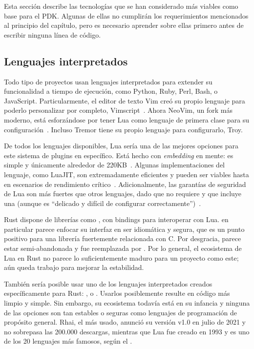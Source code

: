 Esta sección describe las tecnologías que se han considerado más viables como
base para el PDK. Algunas de ellas no cumplirán los requerimientos mencionados
al principio del capítulo, pero es necesario aprender sobre ellas primero antes
de escribir ninguna línea de código.

\subsection{Lenguajes interpretados}

Todo tipo de proyectos usan lenguajes interpretados para extender su
funcionalidad a tiempo de ejecución, como Python, Ruby, Perl, Bash, o
JavaScript. Particularmente, el editor de texto Vim creó su propio lenguaje para
poderlo personalizar por completo, Vimscript~\cite{vimscript}. Ahora NeoVim, un
fork más moderno, está esforzándose por tener Lua como lenguaje de primera clase
para su configuración~\cite{nvimlua}. Incluso Tremor tiene su propio lenguaje
para configurarlo, Troy.

De todos los lenguajes disponibles, Lua sería una de las mejores opciones para
este sistema de plugins en específico. Está hecho con \emph{embedding} en mente:
es simple y únicamente alrededor de 220KB~\cite{ierusalimschy2006programming}.
Algunas implementaciones del lenguaje, como LuaJIT, son extremadamente
eficientes y pueden ser viables hasta en escenarios de rendimiento
crítico~\cite{luajitperf}. Adicionalmente, las garantías de seguridad de Lua son
más fuertes que otros lenguajes, dado que no requiere \unsafe y que incluye una
\sandbox (aunque es ``delicado y difícil de configurar
correctamente'')~\cite{luasandboxes}.

Rust dispone de librerías como , con bindings para interoperar
con Lua.  en particular parece enfocar su interfaz en ser idiomática
y segura, que es un punto positivo para una librería fuertemente relacionada con
C. Por desgracia, parece estar semi-abandonada y fue reemplazada por
. Por lo general, el ecosistema de Lua en Rust no parece lo
suficientemente maduro para un proyecto como este; aún queda trabajo para
mejorar la estabilidad.

También sería posible usar uno de los lenguajes interpretados creados
específicamente para Rust: \textcite{cratesiogluon}, \textcite{cratesiorhai} o
\textcite{cratesiorune}. Usarlos posiblemente resulte en código más limpio y
simple. Sin embargo, su ecosistema todavía está en su infancia y ninguna de las
opciones son tan estables o seguras como lenguajes de programación de propósito
general. Rhai, el más usado, anunció su versión v1.0 en julio de 2021 y no
sobrepasa las 200.000 descargas, mientras que Lua fue creado en 1993 y es uno de
los 20 lenguajes más famosos, según el \textcite{tiobe}.

